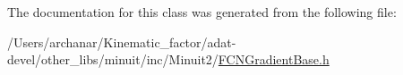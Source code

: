 The documentation for this class was generated from the following file\+:\begin{DoxyCompactItemize}
\item 
/\+Users/archanar/\+Kinematic\+\_\+factor/adat-\/devel/other\+\_\+libs/minuit/inc/\+Minuit2/\mbox{\hyperlink{adat-devel_2other__libs_2minuit_2inc_2Minuit2_2FCNGradientBase_8h}{F\+C\+N\+Gradient\+Base.\+h}}\end{DoxyCompactItemize}
